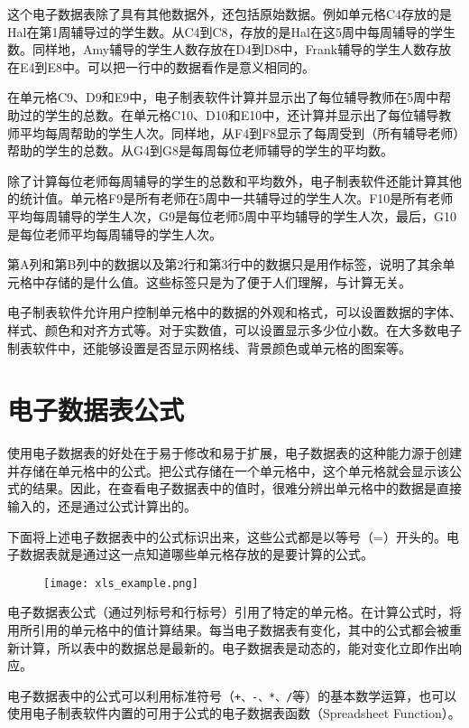这个电子数据表除了具有其他数据外，还包括原始数据。例如单元格C4存放的是Hal在第1周辅导过的学生数。从C4到C8，存放的是Hal在这5周中每周辅导的学生数。同样地，Amy辅导的学生人数存放在D4到D8中，Frank辅导的学生人数存放在E4到E8中。可以把一行中的数据看作是意义相同的。

在单元格C9、D9和E9中，电子制表软件计算并显示出了每位辅导教师在5周中帮助过的学生的总数。在单元格C10、D10和E10中，还计算并显示出了每位辅导教师平均每周帮助的学生人次。同样地，从F4到F8显示了每周受到（所有辅导老师）帮助的学生的总数。从G4到G8是每周每位老师辅导的学生的平均数。

除了计算每位老师每周辅导的学生的总数和平均数外，电子制表软件还能计算其他的统计值。单元格F9是所有老师在5周中一共辅导过的学生人次。F10是所有老师平均每周辅导的学生人次，G9是每位老师5周中平均辅导的学生人次，最后，G10是每位老师平均每周辅导的学生人次。

第A列和第B列中的数据以及第2行和第3行中的数据只是用作标签，说明了其余单元格中存储的是什么值。这些标签只是为了便于人们理解，与计算无关。

电子制表软件允许用户控制单元格中的数据的外观和格式，可以设置数据的字体、样式、颜色和对齐方式等。对于实数值，可以设置显示多少位小数。在大多数电子制表软件中，还能够设置是否显示网格线、背景颜色或单元格的图案等。


\section{电子数据表公式}


使用电子数据表的好处在于易于修改和易于扩展，电子数据表的这种能力源于创建并存储在单元格中的公式。把公式存储在一个单元格中，这个单元格就会显示该公式的结果。因此，在查看电子数据表中的值时，很难分辨出单元格中的数据是直接输入的，还是通过公式计算出的。

下面将上述电子数据表中的公式标识出来，这些公式都是以等号（=）开头的。电子数据表就是通过这一点知道哪些单元格存放的是要计算的公式。

\begin{figure}[!h]
\centering
\texttt{[image: xls\_example.png]}
\label{xls_example}
\end{figure}

电子数据表公式（通过列标号和行标号）引用了特定的单元格。在计算公式时，将用所引用的单元格中的值计算结果。每当电子数据表有变化，其中的公式都会被重新计算，所以表中的数据总是最新的。电子数据表是动态的，能对变化立即作出响应。

电子数据表中的公式可以利用标准符号（\verb|+、-、*、/|等）的基本数学运算，也可以使用电子制表软件内置的可用于公式的电子数据表函数（Spreadsheet Function）。

